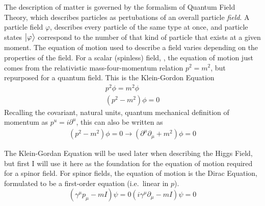     The description of matter is governed by the formalism of Quantum Field Theory, which describes particles as pertubations of an overall particle \textit{field}.
    A particle field $\varphi$, describes every particle of the same type at once,
        and particle states $\big| \varphi \big>$ correspond to the number of that kind of particle that exists at a given moment.
    The equation of motion used to describe a field varies depending on the properties of the field.
    For a scalar (spinless) field, \phi, the equation of motion just comes from the relativistic mass-four-momentum relation $p^2=m^2$,
        but repurposed for a quantum field.
    This is the Klein-Gordon Equation
    \begin{equation} \begin{split}
        p^2 \phi = m^2 \phi
        \\(p^2 - m^2) \phi = 0
    \end{split} \end{equation}
    Recalling the covariant, natural units, quantum mechanical definition of momentum as $p^u = i\partial^u$,
        this can also be written as
    \begin{equation} \begin{split}
        (p^2 - m^2) \phi = 0 \rightarrow (\partial^\mu \partial_\mu + m^2) \phi = 0
    \end{split} \end{equation}

    The Klein-Gordan Equation will be used later when describing the Higgs Field,
        but first I will use it here as the foundation for the equation of motion required for a spinor field.
    For spinor fields, the equation of motion is the Dirac Equation,
        formulated to be a first-order equation (i.e.\ linear in $p$).
    \begin{equation}
        (\gamma^\mu p_\mu - m I) \psi = 0
        (i\gamma^\mu \partial_\mu  - m I) \psi = 0
    \end{equation}

